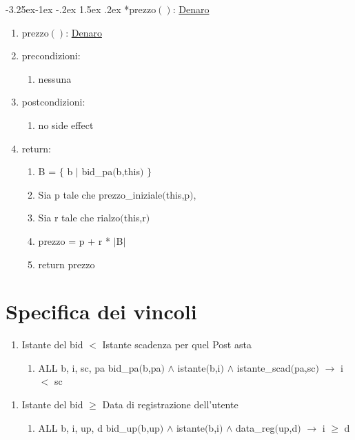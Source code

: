 \documentclass{article}
\makeatletter
\renewcommand\subsection{\@startsection{subsection}{2}{\z@}%
                                     {-3.25ex\@plus-1ex \@minus-.2ex}%
                                     {1.5ex \@plus.2ex}%
                                     {\normalfont\normalsize\bfseries}}
\makeatother
\begin{document}
\subsection*{prezzo$()$: \hyperref[sec:TipoDenaro]{Denaro}}
\begin{enumerate}
    \item\label{sec:OperazioniPostAstaPrezzo}prezzo$()$: \hyperref[sec:TipoDenaro]{Denaro}
    \item precondizioni:
    \begin{enumerate}
        \item nessuna
    \end{enumerate}
    \item postcondizioni:
    \begin{enumerate}
        \item no side effect
    \end{enumerate}
    \item return:
    \begin{enumerate}
        \item B = $\{$ b $|$ bid\_pa$($b,this$)$ $\}$
        \item Sia p tale che prezzo\_iniziale$($this,p$)$,
        \item Sia r tale che rialzo$($this,r$)$
        \item prezzo = p + r * $|$B$|$
        \item return prezzo
    \end{enumerate}
\end{enumerate}

\newpage
\section{\label{sec:SpecificaVincoli}Specifica dei vincoli}

\begin{enumerate}
    \item Istante del bid $<$ Istante scadenza per quel Post asta
    \begin{enumerate}
        \item ALL b, i, sc, pa bid\_pa$($b,pa$)$ $\land$ istante$($b,i$)$ $\land$ istante\_scad$($pa,sc$)$ $\rightarrow$ i $<$ sc
    \end{enumerate}
\end{enumerate}

\begin{enumerate}
    \item Istante del bid $\geq$ Data di registrazione dell'utente
    \begin{enumerate}
        \item ALL b, i, up, d bid\_up$($b,up$)$ $\land$ istante$($b,i$)$ $\land$ data\_reg$($up,d$)$ $\rightarrow$ i $\geq$ d
    \end{enumerate}
\end{enumerate}
\end{document}
